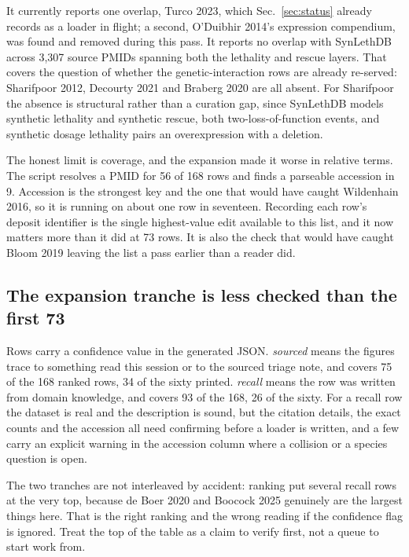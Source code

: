 It currently reports one overlap, Turco 2023, which Sec.~\ref{sec:status} already records
as a loader in flight; a second, O'Duibhir 2014's expression compendium, was found and
removed during this pass. It reports no overlap with SynLethDB across 3,307 source PMIDs
spanning both the lethality and rescue layers. That covers the question of whether the
genetic-interaction rows are already re-served: Sharifpoor 2012, Decourty 2021 and
Braberg 2020 are all absent. For Sharifpoor the absence is structural rather than a curation
gap, since SynLethDB models synthetic lethality and synthetic rescue, both two-loss-of-function
events, and synthetic dosage lethality pairs an overexpression with a deletion.

The honest limit is coverage, and the expansion made it worse in relative terms. The script
resolves a PMID for 56 of 168 rows and finds a parseable accession in 9. Accession is the
strongest key and the one that would have caught Wildenhain 2016, so it is running on about
one row in seventeen. Recording each row's deposit identifier is the single highest-value
edit available to this list, and it now matters more than it did at 73 rows. It is also the check that would have
caught Bloom 2019 leaving the list a pass earlier than a reader did.

\subsection{The expansion tranche is less checked than the first 73}\label{sec:confidence}

Rows carry a confidence value in the generated JSON. \emph{sourced} means the figures trace
to something read this session or to the sourced triage note, and covers 75 of the 168
ranked rows, 34 of the sixty printed. \emph{recall} means the row was written from domain
knowledge, and covers 93 of the 168, 26 of the sixty. For a recall
row the dataset is real and the description is sound, but the citation details, the exact
counts and the accession all need confirming before a loader is written, and a few carry an
explicit warning in the accession column where a collision or a species question is open.

The two tranches are not interleaved by accident: ranking put several recall rows at the very
top, because de Boer 2020 and Boocock 2025 genuinely are the largest things here. That is the
right ranking and the wrong reading if the confidence flag is ignored. Treat the top of the
table as a claim to verify first, not a queue to start work from.


